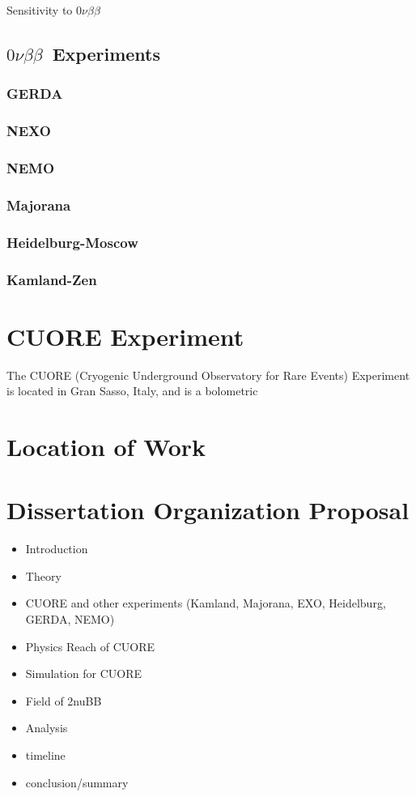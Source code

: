 \documentclass[12pt,a4paper]{article}
\newcommand{\zeronubb}{$0\nu \beta \beta$}
\begin{document}
Sensitivity to \zeronubb~ 

\subsection{\zeronubb~Experiments}
\subsubsection{GERDA}
\subsubsection{NEXO}
\subsubsection{NEMO}
\subsubsection{Majorana}
\subsubsection{Heidelburg-Moscow}
\subsubsection{Kamland-Zen}

\section{CUORE Experiment}

The CUORE (Cryogenic Underground Observatory for Rare Events)  Experiment is located in Gran Sasso, Italy, and is a bolometric 

\section{Location of Work}

\section{Dissertation Organization Proposal}

\begin{itemize}
\item Introduction \checkmark
\item Theory \checkmark
\item CUORE and other experiments (Kamland, Majorana, EXO, Heidelburg, GERDA, NEMO)
\item Physics Reach of CUORE
\item Simulation for CUORE
\item Field of 2nuBB 
\item Analysis
\item timeline
\item conclusion/summary
\end{itemize}
\end{document}
